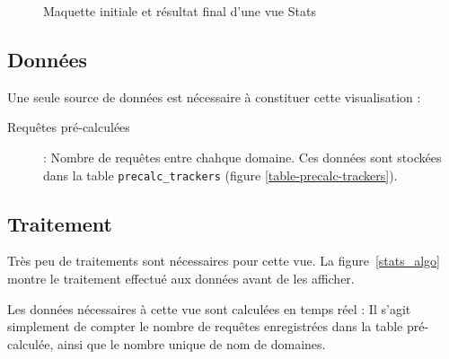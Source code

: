 		\begin{figure}[!h]
			\centering
			\caption{Maquette initiale et résultat final d'une vue Stats}
			\label{stats_images}
		\end{figure}

	\subsection{Données}

		Une seule source de données est nécessaire à constituer cette visualisation :
		\begin{description}
			\item[Requêtes pré-calculées] : Nombre de requêtes entre chahque domaine. Ces données sont stockées dans la table \texttt{precalc\_trackers} (figure \ref{table-precalc-trackers}).
		\end{description}

	\subsection{Traitement}

		Très peu de traitements sont nécessaires pour cette vue. La figure~\ref{stats_algo} montre le traitement effectué aux données avant de les afficher.

		Les données nécessaires à cette vue sont calculées en temps réel : Il s'agit simplement de compter le nombre de requêtes enregistrées dans la table pré-calculée, ainsi que le nombre unique de nom de domaines.

